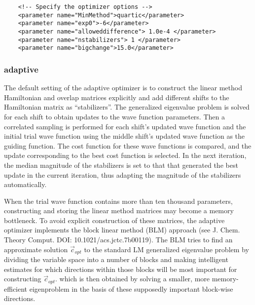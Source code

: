 \begin{lstlisting}
    <!-- Specify the optimizer options -->
    <parameter name="MinMethod">quartic</parameter>
    <parameter name="exp0">-6</parameter>
    <parameter name="alloweddifference"> 1.0e-4 </parameter>
    <parameter name="nstabilizers"> 1 </parameter>
    <parameter name="bigchange">15.0</parameter>
\end{lstlisting}

\subsubsection{adaptive}

The default setting of the adaptive optimizer is to construct the linear method Hamiltonian and overlap matrices explicitly and add different shifts to the Hamiltonian matrix 
as ``stabilizers''.
The generalized eigenvalue problem is solved for each shift to obtain updates to the wave function parameters.
Then a correlated sampling is performed for each shift's updated wave function and the initial trial wave function
using the middle shift's updated wave function as the guiding function.
The cost function for these wave functions is compared, and the update corresponding to the best cost function is selected.
In the next iteration, the median magnitude of the stabilizers is set to that that generated the best update in the current iteration, thus adapting the magnitude of
the stabilizers automatically.

When the trial wave function contains more than ten thousand parameters, constructing and storing the linear method matrices may become a memory bottleneck. 
To avoid explicit construction of these matrices, the adaptive optimizer implements the block linear method (BLM) approach
(see J. Chem. Theory Comput. DOI: 10.1021/acs.jctc.7b00119).
The BLM tries to find an approximate 
solution $\vec{c}_{opt}$ to the standard LM generalized eigenvalue problem by dividing the variable space into a number of blocks
and making intelligent estimates for which directions within those blocks will be most important for constructing $\vec{c}_{opt}$.
which is then obtained by solving a smaller, more memory-efficient 
eigenproblem in the basis of these supposedly important block-wise directions. 

